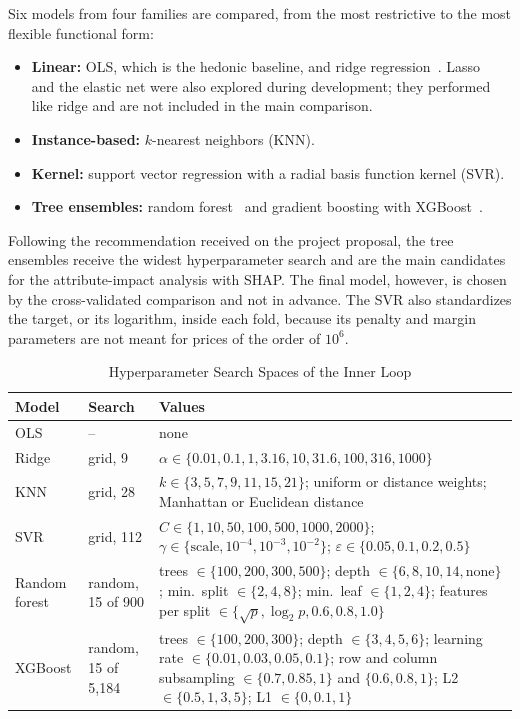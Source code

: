 \documentclass[conference]{IEEEtran}
\begin{document}
Six models from four families are compared, from the most restrictive to the most flexible functional form:
\begin{itemize}
  \item \textbf{Linear:} OLS, which is the hedonic baseline, and ridge regression~\cite{hastie2009}. Lasso~\cite{tibshirani1996} and the elastic net were also explored during development; they performed like ridge and are not included in the main comparison.
  \item \textbf{Instance-based:} $k$-nearest neighbors (KNN).
  \item \textbf{Kernel:} support vector regression with a radial basis function kernel (SVR).
  \item \textbf{Tree ensembles:} random forest~\cite{breiman2001} and gradient boosting with XGBoost~\cite{chen2016}.
\end{itemize}
Following the recommendation received on the project proposal, the tree ensembles receive the widest hyperparameter search and are the main candidates for the attribute-impact analysis with SHAP. The final model, however, is chosen by the cross-validated comparison and not in advance. The SVR also standardizes the target, or its logarithm, inside each fold, because its penalty and margin parameters are not meant for prices of the order of $10^6$.

\begin{table}[!t]
\caption{Hyperparameter Search Spaces of the Inner Loop}
\label{tab:search}
\centering
\footnotesize
\setlength{\tabcolsep}{3pt}
\begin{tabular}{@{}>{\raggedright\arraybackslash}p{}>{\raggedright\arraybackslash}p{}>{\raggedright\arraybackslash}p{}@{}}
\toprule
Model & Search & Values \\
\midrule
OLS & -- & none \\
Ridge & grid, 9 & $\alpha \in \{0.01, 0.1, 1, 3.16, 10, 31.6, 100, 316, 1000\}$ \\
KNN & grid, 28 & $k \in \{3, 5, 7, 9, 11, 15, 21\}$; uniform or distance weights; Manhattan or Euclidean distance \\
SVR & grid, 112 & $C \in \{1, 10, 50, 100, 500, 1000, 2000\}$; $\gamma \in \{\text{scale}, 10^{-4}, 10^{-3}, 10^{-2}\}$; $\varepsilon \in \{0.05, 0.1, 0.2, 0.5\}$ \\
Random forest & random, 15 of 900 & trees $\in \{100, 200, 300, 500\}$; depth $\in \{6, 8, 10, 14, \text{none}\}$; min.\ split $\in \{2, 4, 8\}$; min.\ leaf $\in \{1, 2, 4\}$; features per split $\in \{\sqrt{p}, \log_2 p, 0.6, 0.8, 1.0\}$ \\
XGBoost & random, 15 of 5{,}184 & trees $\in \{100, 200, 300\}$; depth $\in \{3, 4, 5, 6\}$; learning rate $\in \{0.01, 0.03, 0.05, 0.1\}$; row and column subsampling $\in \{0.7, 0.85, 1\}$ and $\{0.6, 0.8, 1\}$; L2 $\in \{0.5, 1, 3, 5\}$; L1 $\in \{0, 0.1, 1\}$ \\
\bottomrule
\end{tabular}
\end{table}
\end{document}
